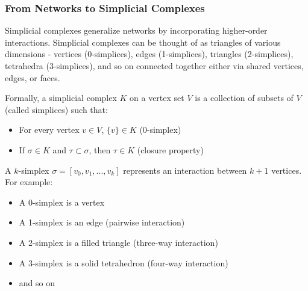 \subsubsection{From Networks to Simplicial Complexes}

Simplicial complexes generalize networks by incorporating higher-order interactions. Simplicial complexes can be thought of as triangles of various dimensions - vertices (0-simplices), edges (1-simplices), triangles (2-simplices), tetrahedra (3-simplices), and so on \citep{petri2014homological} connected together either via shared vertices, edges, or faces.

Formally, a simplicial complex $K$ on a vertex set $V$ is a collection of subsets of $V$ (called simplices) such that:
\begin{itemize}
    \item For every vertex $v \in V$, $\{v\} \in K$ (0-simplex)
    \item If $\sigma \in K$ and $\tau \subset \sigma$, then $\tau \in K$ (closure property)
\end{itemize}

A $k$-simplex $\sigma = [v_0, v_1, ..., v_k]$ represents an interaction between $k+1$ vertices. For example:
\begin{itemize}
    \item A 0-simplex is a vertex
    \item A 1-simplex is an edge (pairwise interaction)
    \item A 2-simplex is a filled triangle (three-way interaction)
    \item A 3-simplex is a solid tetrahedron (four-way interaction)
    \item and so on
\end{itemize}


